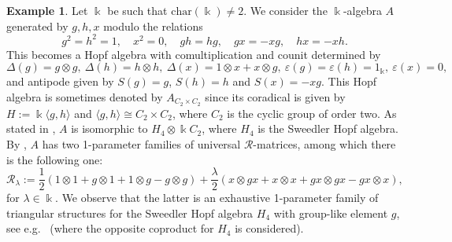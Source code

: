 \documentclass[nosumlimits,twoside]{amsart}
\theoremstyle{definition}
\newtheorem{example}[example]{\sc Example}
\theoremstyle{remark}
\newcommand{\as}[1]{{\color{blue}{#1}}}
\newcommand{\Rr}{\mathcal{R}}
\newcommand{\ot}{\otimes}
\begin{document}
\begin{example}
Let $\Bbbk$ be such that $\mathrm{char}(\Bbbk)\not=2$. We consider the $\Bbbk$-algebra $A$ generated by $g,h,x$ modulo the relations 
\[
g^{2}=h^{2}=1,\quad x^{2}=0,\quad gh=hg,\quad gx=-xg,\quad hx=-xh.
\]
This becomes a Hopf algebra with comultiplication and counit determined by
\[
\Delta(g)=g\otimes g,\ \Delta(h)=h\otimes h,\ \Delta(x)=1\otimes x+x\otimes g,\ \varepsilon(g)=\varepsilon(h)=1_{\Bbbk},\ \varepsilon(x)=0,
\]
and antipode given by $S(g)=g$, $S(h)=h$ and $S(x)=-xg$. This Hopf algebra is sometimes denoted by $A_{C_{2}\times C_{2}}$ since its coradical is given by $H:=\Bbbk\langle g,h\rangle$ and $\langle g,h\rangle\cong C_{2}\times C_{2}$, where $C_{2}$ is the cyclic group of order two. As stated in \cite[p.\ 559]{CDR}, $A$ is
isomorphic to $H_{4}\ot\Bbbk C_{2}$, where $H_{4}$ is the Sweedler Hopf algebra.  By \cite[Theorem 1.4]{Wakui}, $A$ has two 1-parameter families of universal $\Rr$-matrices, among which there is the following one:
\[
\Rr_{\lambda}:=\frac{1}{2}(1\ot1+g\ot1+1\ot g-g\ot g)+\frac{\lambda}{2}(x\ot gx+x\ot x+gx\ot gx-gx\ot x),
\]
for $\lambda\in\Bbbk$. We observe that the latter is an exhaustive 1-parameter family of triangular structures for the Sweedler Hopf algebra $H_{4}$ with group-like element $g$, see e.g.\ \cite[Exercise 2.1.7]{Majid-book} (where the opposite coproduct for $H_{4}$ is considered).


\end{example}
\end{document}
